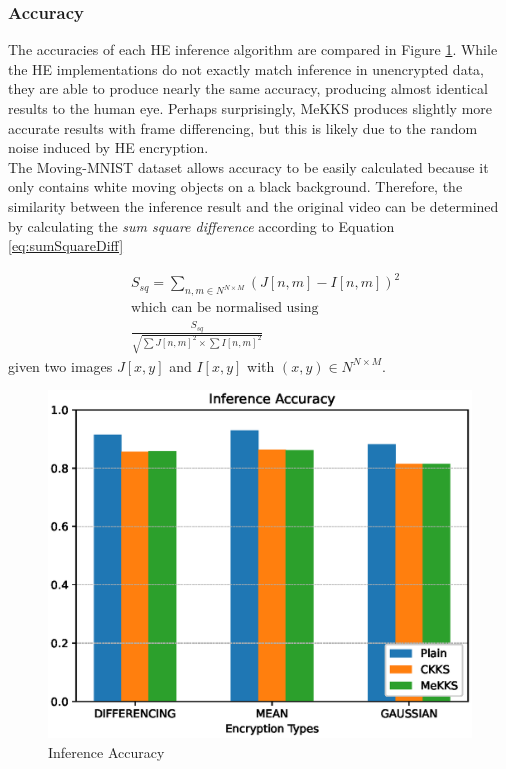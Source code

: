 \setlength{\leftskip}{0cm}
\subsubsection{Accuracy}
\setlength{\leftskip}{0.5cm}
\indent \indent
The accuracies of each HE inference algorithm are compared in Figure \ref{fig:accuracy}. While the HE implementations do not exactly match inference in unencrypted data, they are able to produce nearly the same accuracy, producing almost identical results to the human eye. Perhaps surprisingly, MeKKS produces slightly more accurate results with frame differencing, but this is likely due to the random noise induced by HE encryption.  
\smallskip \\ \indent
The Moving-MNIST dataset allows accuracy to be easily calculated because it only contains white moving objects on a black background. Therefore, the similarity between the inference result and the original video can be determined by calculating the \textit{sum square difference} according to Equation \ref{eq:sumSquareDiff}

\begin{equation}
    \label{eq:sumSquareDiff}
    \begin{split}
    &S_{sq} = \sum_{n,m \in N^{N \times M}} (J[n, m] - I[n, m])^2 \\
    &\textrm{which can be normalised using} \\
    &\frac{S_{sq}}{\sqrt{\sum J[n,m]^2 \times \sum I[n,m]^2}}
    \end{split}
\end{equation}
given two images $J[x,y]$ and $I[x,y]$ with $(x,y) \in N^{N \times M}$.
\begin{figure}[h!]
    \centering
    \includegraphics[scale=0.6]{figures/accuracy}
    \caption{Inference Accuracy}
    \label{fig:accuracy}
\end{figure}

